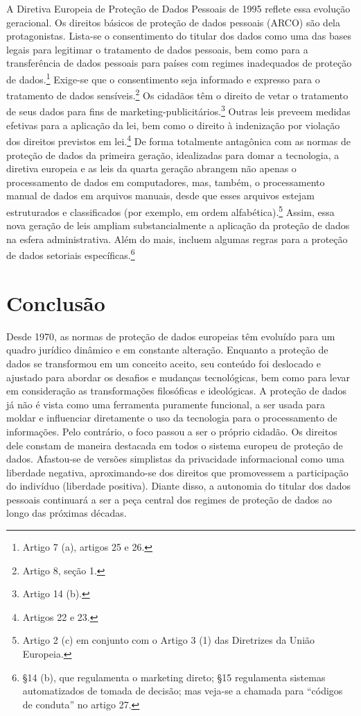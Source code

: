 A Diretiva Europeia de Proteção de Dados Pessoais de 1995 reflete essa
evolução geracional. Os direitos básicos de proteção de dados pessoais
(ARCO) são dela protagonistas. Lista-se o consentimento do titular dos
dados como uma das bases legais para legitimar o tratamento de dados
pessoais, bem como para a transferência de dados pessoais para países
com regimes inadequados de proteção de dados.\footnote{Artigo 7 (a),
  artigos 25 e 26.} Exige-se que o consentimento seja informado e
expresso para o tratamento de dados sensíveis.\footnote{Artigo 8, seção
  1.} Os cidadãos têm o direito de vetar o tratamento de seus dados para
fins de marketing-publicitários.\footnote{Artigo 14 (b).} Outras leis
preveem medidas efetivas para a aplicação da lei, bem como o direito à
indenização por violação dos direitos previstos em lei.\footnote{Artigos
  22 e 23.} De forma totalmente antagônica com as normas de proteção de
dados da primeira geração, idealizadas para domar a tecnologia, a
diretiva europeia e as leis da quarta geração abrangem não apenas o
processamento de dados em computadores, mas, também, o processamento
manual de dados em arquivos manuais, desde que esses arquivos estejam
estruturados e classificados (por exemplo, em ordem
alfabética).\footnote{Artigo 2 (c) em conjunto com o Artigo 3 (1) das
  Diretrizes da União Europeia.} Assim, essa nova geração de leis
ampliam substancialmente a aplicação da proteção de dados na esfera
administrativa. Além do mais, incluem algumas regras para a proteção de
dados setoriais específicas.\footnote{§14 (b), que regulamenta o
  marketing direto; §15 regulamenta sistemas automatizados de tomada de
  decisão; mas veja-se a chamada para ``códigos de conduta'' no artigo
  27.}

\section{Conclusão}

Desde 1970, as normas de proteção de dados europeias têm evoluído para
um quadro jurídico dinâmico e em constante alteração. Enquanto a
proteção de dados se transformou em um conceito aceito, seu conteúdo foi
deslocado e ajustado para abordar os desafios e mudanças tecnológicas,
bem como para levar em consideração as transformações filosóficas e
ideológicas. A proteção de dados já não é vista como uma ferramenta
puramente funcional, a ser usada para moldar e influenciar diretamente o
uso da tecnologia para o processamento de informações. Pelo contrário, o
foco passou a ser o próprio cidadão. Os direitos dele constam de maneira
destacada em todos o sistema europeu de proteção de dados. Afastou-se de
versões simplistas da privacidade informacional como uma liberdade
negativa, aproximando-se dos direitos que promovessem a participação do
indivíduo (liberdade positiva). Diante disso, a autonomia do titular dos
dados pessoais continuará a ser a peça central dos regimes de proteção
de dados ao longo das próximas décadas.

